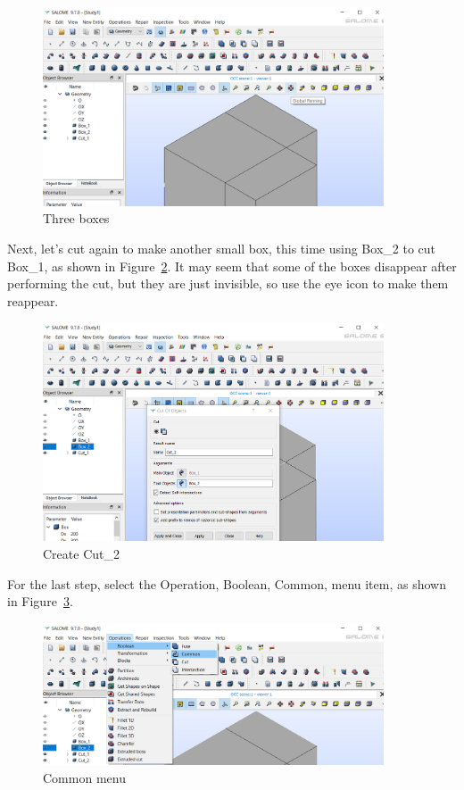 \begin{figure}[H]
\centering
\includegraphics[width=0.9\textwidth]{Salome-07}
\caption{Three boxes}\label{fg:salome-07}
\end{figure}

Next, let's cut again to make another small box, this time using Box\_2 to cut Box\_1, as shown in Figure~\ref{fg:salome-08}.  It may seem that some of the boxes disappear after performing the cut, but they are just invisible, so use the eye icon to make them reappear.

\begin{figure}[H]
\centering
\includegraphics[width=0.9\textwidth]{Salome-08}
\caption{Create Cut\_2}\label{fg:salome-08}
\end{figure}

For the last step, select the Operation, Boolean, Common, menu item, as shown in Figure~\ref{fg:salome-09}.

\begin{figure}[H]
\centering
\includegraphics[width=0.9\textwidth]{Salome-09}
\caption{Common menu}\label{fg:salome-09}
\end{figure}

